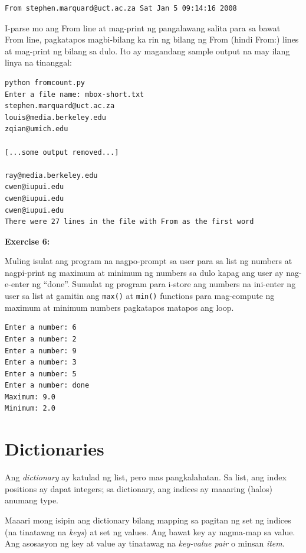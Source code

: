 \documentclass[10pt,]{book}
\begin{document}
{\small
\begin{verbatim}
From stephen.marquard@uct.ac.za Sat Jan 5 09:14:16 2008
\end{verbatim}
}

I-parse mo ang From line at mag-print ng pangalawang salita para sa
bawat From line, pagkatapos magbi-bilang ka rin ng bilang ng From (hindi
From:) lines at mag-print ng bilang sa dulo. Ito ay magandang sample
output na may ilang linya na tinanggal:

{\small
\begin{verbatim}
python fromcount.py
Enter a file name: mbox-short.txt
stephen.marquard@uct.ac.za
louis@media.berkeley.edu
zqian@umich.edu

[...some output removed...]

ray@media.berkeley.edu
cwen@iupui.edu
cwen@iupui.edu
cwen@iupui.edu
There were 27 lines in the file with From as the first word
\end{verbatim}
}

\textbf{Exercise 6:}

Muling isulat ang program na nagpo-prompt sa user para sa list ng
numbers at nagpi-print ng maximum at minimum ng numbers sa dulo kapag
ang user ay nag-e-enter ng ``done''. Sumulat ng program para i-store ang
numbers na ini-enter ng user sa list at gamitin ang \texttt{max()} at
\texttt{min()} functions para mag-compute ng maximum at minimum numbers
pagkatapos matapos ang loop.

{\small
\begin{verbatim}
Enter a number: 6
Enter a number: 2
Enter a number: 9
Enter a number: 3
Enter a number: 5
Enter a number: done
Maximum: 9.0
Minimum: 2.0
\end{verbatim}
}

\chapter{Dictionaries}\label{dictionaries}

 

   
\index{}

Ang \emph{dictionary} ay katulad ng list, pero mas pangkalahatan. Sa
list, ang index positions ay dapat integers; sa dictionary, ang indices
ay maaaring (halos) anumang type.

Maaari mong isipin ang dictionary bilang mapping sa pagitan ng set ng
indices (na tinatawag na \emph{keys}) at set ng values. Ang bawat key ay
nagma-map sa value. Ang asosasyon ng key at value ay tinatawag na
\emph{key-value pair} o minsan \emph{item}.
\end{document}
